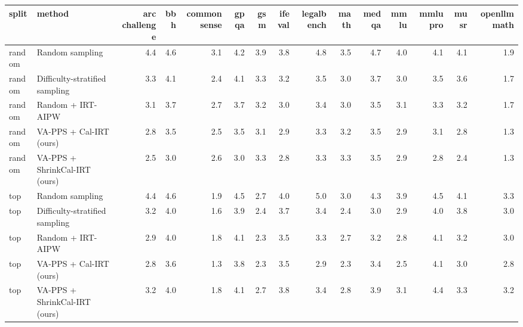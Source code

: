 \begin{tabular}{llrrrrrrrrrrrrr}
\toprule
split & method & arc challenge & bbh & commonsense & gpqa & gsm & ifeval & legalbench & math & med qa & mmlu & mmlu pro & musr & openllm math \\
\midrule
random & Random sampling & 4.4 & 4.6 & 3.1 & 4.2 & 3.9 & 3.8 & 4.8 & 3.5 & 4.7 & 4.0 & 4.1 & 4.1 & 1.9 \\
random & Difficulty-stratified sampling & 3.3 & 4.1 & 2.4 & 4.1 & 3.3 & 3.2 & 3.5 & 3.0 & 3.7 & 3.0 & 3.5 & 3.6 & 1.7 \\
random & Random + IRT-AIPW & 3.1 & 3.7 & 2.7 & 3.7 & 3.2 & 3.0 & 3.4 & 3.0 & 3.5 & 3.1 & 3.3 & 3.2 & 1.7 \\
random & VA-PPS + Cal-IRT (ours) & 2.8 & 3.5 & 2.5 & 3.5 & 3.1 & 2.9 & 3.3 & 3.2 & 3.5 & 2.9 & 3.1 & 2.8 & 1.3 \\
random & VA-PPS + ShrinkCal-IRT (ours) & 2.5 & 3.0 & 2.6 & 3.0 & 3.3 & 2.8 & 3.3 & 3.3 & 3.5 & 2.9 & 2.8 & 2.4 & 1.3 \\
top & Random sampling & 4.4 & 4.6 & 1.9 & 4.5 & 2.7 & 4.0 & 5.0 & 3.0 & 4.3 & 3.9 & 4.5 & 4.1 & 3.3 \\
top & Difficulty-stratified sampling & 3.2 & 4.0 & 1.6 & 3.9 & 2.4 & 3.7 & 3.4 & 2.4 & 3.0 & 2.9 & 4.0 & 3.8 & 3.0 \\
top & Random + IRT-AIPW & 2.9 & 4.0 & 1.8 & 4.1 & 2.3 & 3.5 & 3.3 & 2.7 & 3.2 & 2.8 & 4.1 & 3.2 & 3.0 \\
top & VA-PPS + Cal-IRT (ours) & 2.8 & 3.6 & 1.3 & 3.8 & 2.3 & 3.5 & 2.9 & 2.3 & 3.4 & 2.5 & 4.1 & 3.0 & 2.8 \\
top & VA-PPS + ShrinkCal-IRT (ours) & 3.2 & 4.0 & 1.8 & 4.1 & 2.7 & 3.8 & 3.4 & 2.8 & 3.9 & 3.1 & 4.4 & 3.3 & 3.2 \\
\bottomrule
\end{tabular}
